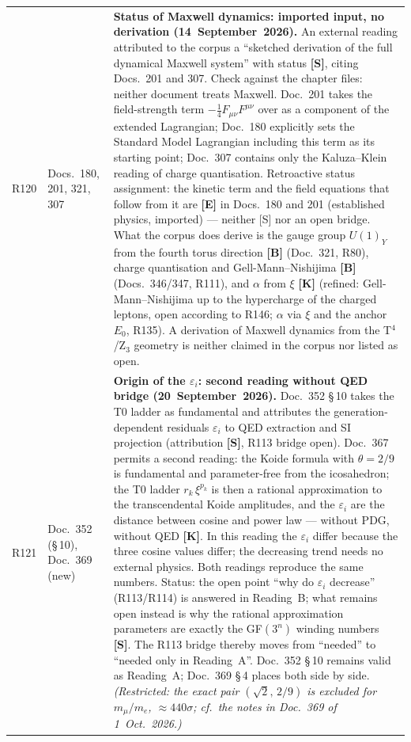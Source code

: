 \begin{longtable}{@{}p{0.9cm}p{3.1cm}p{10.2cm}@{}}
R120 & Docs.~180, 201, 321, 307 & \textbf{Status of Maxwell dynamics: imported input, no derivation (14~September~2026).} An external reading attributed to the corpus a ``sketched derivation of the full dynamical Maxwell system'' with status \textbf{[S]}, citing Docs.~201 and 307. Check against the chapter files: neither document treats Maxwell. Doc.~201 takes the field-strength term $-\tfrac14 F_{\mu\nu}F^{\mu\nu}$ over as a component of the extended Lagrangian; Doc.~180 explicitly sets the Standard Model Lagrangian including this term as its starting point; Doc.~307 contains only the Kaluza--Klein reading of charge quantisation. Retroactive status assignment: the kinetic term and the field equations that follow from it are \textbf{[E]} in Docs.~180 and 201 (established physics, imported) --- neither [S] nor an open bridge. What the corpus does derive is the gauge group $U(1)_Y$ from the fourth torus direction \textbf{[B]} (Doc.~321, R80), charge quantisation and Gell-Mann--Nishijima \textbf{[B]} (Docs.~346/347, R111), and $\alpha$ from $\xi$ \textbf{[K]} (refined: Gell-Mann--Nishijima up to the hypercharge of the charged leptons, open according to R146; $\alpha$ via $\xi$ and the anchor $E_0$, R135). A derivation of Maxwell dynamics from the T$^4$/Z$_3$ geometry is neither claimed in the corpus nor listed as open. \\
R121 & Doc.~352 (§\,10), Doc.~369 (new) & \textbf{Origin of the $\varepsilon_i$: second reading without QED bridge (20~September~2026).} Doc.~352 §\,10 takes the T0 ladder as fundamental and attributes the generation-dependent residuals $\varepsilon_i$ to QED extraction and SI projection (attribution \textbf{[S]}, R113 bridge open). Doc.~367 permits a second reading: the Koide formula with $\theta=2/9$ is fundamental and parameter-free from the icosahedron; the T0 ladder $r_k\,\xi^{p_k}$ is then a rational approximation to the transcendental Koide amplitudes, and the $\varepsilon_i$ are the distance between cosine and power law --- without PDG, without QED \textbf{[K]}. In this reading the $\varepsilon_i$ differ because the three cosine values differ; the decreasing trend needs no external physics. Both readings reproduce the same numbers. Status: the open point ``why do $\varepsilon_i$ decrease'' (R113/R114) is answered in Reading~B; what remains open instead is why the rational approximation parameters are exactly the GF$(3^n)$ winding numbers \textbf{[S]}. The R113 bridge thereby moves from ``needed'' to ``needed only in Reading~A''. Doc.~352 §\,10 remains valid as Reading~A; Doc.~369 §\,4 places both side by side. \emph{(Restricted: the exact pair $(\sqrt2,\,2/9)$ is excluded for $m_\mu/m_e$, ${\approx}440\sigma$; cf.\ the notes in Doc.~369 of 1~Oct.~2026.)} \\

\end{longtable}
